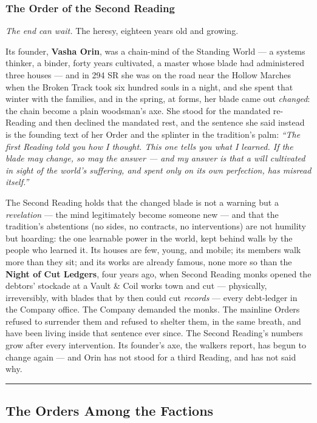 \subsubsection{The Order of the Second Reading}

\textit{The end can wait.} The heresy, eighteen years old and growing.

Its founder, \textbf{Vasha Orin}, was a chain-mind of the Standing World --- a systems thinker, a binder, forty years cultivated, a master whose blade had administered three houses --- and in 294 SR she was on the road near the Hollow Marches when the Broken Track took six hundred souls in a night, and she spent that winter with the families, and in the spring, at forms, her blade came out \textit{changed}: the chain become a plain woodsman's axe. She stood for the mandated re-Reading and then declined the mandated rest, and the sentence she said instead is the founding text of her Order and the splinter in the tradition's palm: \textit{``The first Reading told you how I thought. This one tells you what I learned. If the blade may change, so may the answer --- and my answer is that a will cultivated in sight of the world's suffering, and spent only on its own perfection, has misread itself.''}

The Second Reading holds that the changed blade is not a warning but a \textit{revelation} --- the mind legitimately become someone new --- and that the tradition's abstentions (no sides, no contracts, no interventions) are not humility but hoarding: the one learnable power in the world, kept behind walls by the people who learned it. Its houses are few, young, and mobile; its members walk more than they sit; and its works are already famous, none more so than the \textbf{Night of Cut Ledgers}, four years ago, when Second Reading monks opened the debtors' stockade at a Vault \& Coil works town and cut --- physically, irreversibly, with blades that by then could cut \textit{records} --- every debt-ledger in the Company office. The Company demanded the monks. The mainline Orders refused to surrender them and refused to shelter them, in the same breath, and have been living inside that sentence ever since. The Second Reading's numbers grow after every intervention. Its founder's axe, the walkers report, has begun to change again --- and Orin has not stood for a third Reading, and has not said why.

\medskip\hrule\medskip

\subsection{The Orders Among the Factions}

